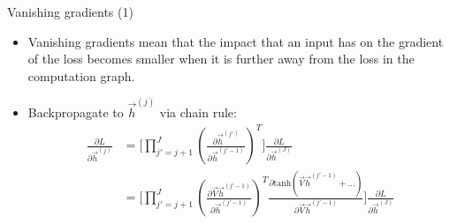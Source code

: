 \documentclass[11pt,compress,t,notes=noshow, xcolor=table]{beamer}
\begin{document}
\fi

\begin{vbframe}{Vanishing gradients (1)}

\vfill

\begin{itemize}
	\item Vanishing gradients mean that the impact that an input has on the gradient of the loss becomes smaller when it is further away from the loss in the computation graph.
\end{itemize}

\begin{itemize}
\item Backpropagate to $\vec h^{(j)}$ via chain rule:
$$
\begin{aligned}
\frac{\partial L}{\partial \vec h^{(j)}} & = \big[\prod_{j'=j+1}^{J} (\frac{\partial \vec h^{(j')}}{\partial \vec h^{(j'-1)}})^T\big] \frac{\partial L}{\partial \vec h^{(J)}} \\
& = \big[\prod_{j'=j+1}^{J} (\frac{\partial \vec V \vec h^{(j'-1)}}{\partial \vec h^{(j'-1)}})^T \frac{\partial \mathrm{tanh}(\vec V \vec h^{(j'-1)} + \ldots)}{\partial \vec V \vec h^{(j'-1)}} \big] \frac{\partial L}{\partial \vec h^{(J)}}
\end{aligned}
$$
\end{itemize}

\vfill

\end{vbframe}

\end{document}
